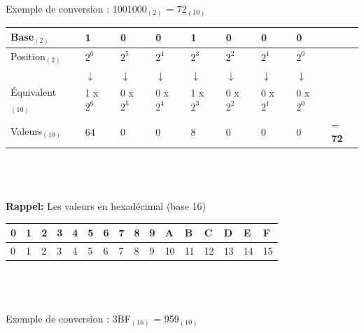\begin{Exercice}[20 minutes]
\begin{conseil}
        Exemple de conversion : 1001000$_{(2)}$ = 72$_{(10)}$\\
\begin{tabular}
    {| C{0.15\textwidth} | C{0.07\textwidth} | C{0.07\textwidth} | C{0.07\textwidth} | C{0.07\textwidth} | C{0.07\textwidth} | C{0.07\textwidth} | C{0.07\textwidth} | C{0.06\textwidth} |} 
            \hline
            Base$_{(2)}$ & \textbf{1} & \textbf{0} & \textbf{0} & \textbf{1} & \textbf{0} & \textbf{0} & \textbf{0} & \textbf{}\\ [0.5ex]
            \hline
            Position$_{(2)}$ & $2^6$ & $2^5$ & $2^4$ & $2^3$ & $2^2$ & $2^1$ & $2^0$ & \\ [0.5ex] 
            \hline
             & $\downarrow$ & $\downarrow$ & $\downarrow$ & $\downarrow$ & $\downarrow$ & $\downarrow$ & $\downarrow$ & \\ [0.5ex] 
            \hline
            Équivalent$_{(10)}$ & 1 x $2^6$ & 0 x $2^5$ & 0 x $2^4$ & 1 x $2^3$ & 0 x $2^2$ & 0 x $2^1$ & 0 x $2^0$ & \\ [0.5ex]     
            \hline
            Valeurs$_{(10)}$ & 64 & 0 & 0 & 8 & 0 & 0 & 0 & = \textbf{72} \\ [0.5ex]
            \hline
\end{tabular}
\\\\\\
\textbf{Rappel:} Les valeurs en hexadécimal (base 16)\\
\begin{tabular}{| C{0.030\textwidth} | C{0.030\textwidth} | C{0.030\textwidth} | C{0.030\textwidth} | C{0.030\textwidth} | C{0.030\textwidth} | C{0.030\textwidth} | C{0.030\textwidth} | C{0.030\textwidth} | C{0.030\textwidth} | C{0.030\textwidth} | C{0.030\textwidth} | C{0.030\textwidth} | C{0.030\textwidth} | C{0.030\textwidth} | C{0.030\textwidth} |} 
            \hline
            \textbf{0} & \textbf{1} & \textbf{2} & \textbf{3} & \textbf{4} & \textbf{5} & \textbf{6} & \textbf{7} & \textbf{8} & \textbf{9} & \textbf{A} & \textbf{B} & \textbf{C} & \textbf{D} & \textbf{E} & \textbf{F}\\ [0.5ex]
             & 1 & 2 & 3 & 4 & 5 & 6 & 7 & 8 & 9 & 10 & 11 & 12 & 13 & 14 & 15 \\ [0.5ex] 
            \hline
\end{tabular}
\\\\\\
Exemple de conversion : 3BF$_{(16)}$ = 959$_{(10)}$\\

\end{conseil}
\end{Exercice}

